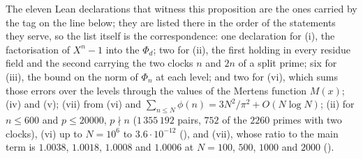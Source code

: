 {\raggedright
The eleven Lean declarations that witness this proposition are
the ones carried by the tag on the line below; they are listed
there in the order of the statements they serve, so the list
itself is the correspondence: one declaration for \textup{(i)},
the factorisation of $X^n-1$ into the $\Phi_d$; two for
\textup{(ii)}, the first holding in every residue field and the
second carrying the two clocks $n$ and $2n$ of a split prime;
six for \textup{(iii)}, the bound on the norm of $\Phi_n$ at
each level; and two for \textup{(vi)}, which sums those errors
over the levels through the values of the Mertens function
$M(x)$;
(iv) and (v); (vii) from (vi) and $\sum_{n\leq N}\phi(n)=3N^2/\pi^2+O(N\log N)$;
(ii) for $n\leq600$ and $p\leq20000$, $p\nmid n$ ($1\,355\,192$ pairs,
$752$ of the $2260$ primes with two clocks), (vi) up to $N=10^6$ to $3.6\cdot10^{-12}$
(), and (vii), whose ratio to the main term is
$1.0038$, $1.0018$, $1.0008$ and $1.0006$ at $N=100$, $500$, $1000$ and $2000$
().
\par}


